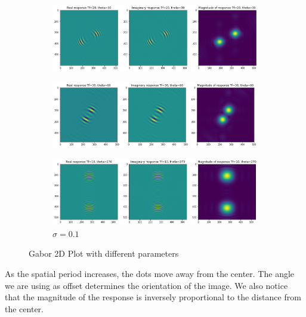 \documentclass[12pt, oneside]{article}
\begin{document}
\begin{figure}[H]
    \centering
    \begin{subfigure}[b]{1\textwidth}
        \centering
        \includegraphics[width=\textwidth]{imgs/q2.1_plot2.png}
    \end{subfigure}
    \hfill
    \begin{subfigure}[b]{1\textwidth}
        \centering
        \includegraphics[width=\textwidth]{imgs/q2.1_plot3.png}
    \end{subfigure}
    \hfill
    \begin{subfigure}[b]{1\textwidth}
        \centering
        \includegraphics[width=\textwidth]{imgs/q2.1_plot4.png}
        \caption{$\sigma = 0.1$}
    \end{subfigure}
       \caption{Gabor 2D Plot with different parameters}
       \label{fig:three graphs}
\end{figure}

As the spatial period increases, the dots move away from the center. The angle we are using as offset determines the orientation of the image. We also notice that the magnitude of the response is inversely proportional to the distance from the center.
\end{document}
